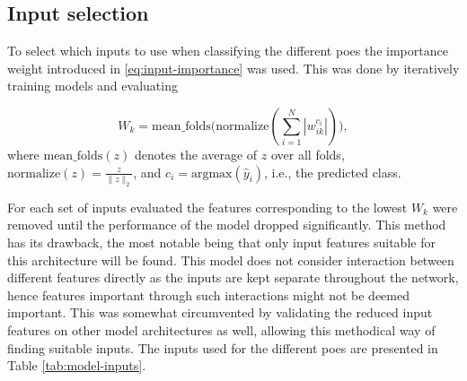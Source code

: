 
\subsection{Input selection} \label{sec:met-inputs}
To select which inputs to use when classifying the different \glspl{poe} the importance weight introduced in \eqref{eq:input-importance} was used. This was done by iteratively training models and evaluating

\begin{equation}
    W_k = \text{mean\_folds}\Big( \text{normalize}(\sum_{i=1}^N |w_{ik}^{c_i}|) \Big),
    \label{eq:feat-select}
\end{equation}
where $\text{mean\_folds}(z)$ denotes the average of $z$ over all folds, $\text{normalize}(z) = \frac{z}{\lVert z \rVert_2}$, and $c_i = \text{argmax}(\hat{y}_i)$, i.e., the predicted class.

For each set of inputs evaluated the features corresponding to the lowest $W_k$ were removed until the performance of the model dropped significantly. This method has its drawback, the most notable being that only input features suitable for this architecture will be found. This model does not consider interaction between different features directly as the inputs are kept separate throughout the network, hence features important through such interactions might not be deemed important. This was somewhat circumvented by validating the reduced input features on other model architectures as well, allowing this methodical way of finding suitable inputs. The inputs used for the different \glspl{poe} are presented in Table \ref{tab:model-inputs}.



